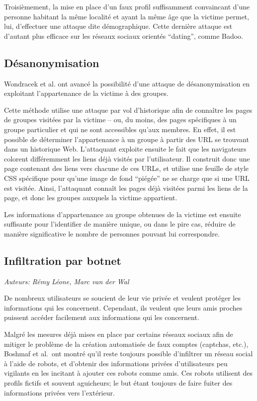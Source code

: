 Troisièmement, la mise en place d'un faux profil suffisamment convaincant d'une
personne habitant la même localité et ayant la même âge que la victime permet,
lui, d'effectuer une attaque dite démographique.  Cette dernière attaque est
d'autant plus efficace sur les réseaux sociaux orientés ``dating'', comme Badoo.


\subsection{Désanonymisation}

Wondracek et al. ont avancé la possibilité d'une attaque de désanonymisation en
exploitant l'appartenance de la victime à des groupes. \cite{whkk10}

Cette méthode utilise une attaque par vol d'historique afin de connaître les
pages de groupes visitées par la victime -- ou, du moins, des pages spécifiques à
un groupe particulier et qui ne sont accessibles qu'aux membres. En effet, il est
possible de déterminer l'appartenance à un groupe à partir des URL se trouvant dans un
historique Web.  L'attaquant exploite ensuite le fait que les navigateurs
colorent différemment les liens déjà visités par l'utilisateur. Il construit
donc une page contenant des liens vers chacune de ces URLs, et utilise une
feuille de style CSS spécifique pour qu'une image de fond ``piégée'' ne se
charge que si une URL est visitée.  Ainsi, l'attaquant connaît les pages déjà
visitées parmi les liens de la page, et donc les groupes auxquels la victime
appartient.

Les informations d'appartenance au groupe obtenues de la victime est ensuite
suffisante pour l'identifier de manière unique, ou dans le pire cas, réduire de
manière significative le nombre de personnes pouvant lui correspondre.

\subsection{Infiltration par botnet}

\begin{flushright}\textit{Auteurs: Rémy Léone, Marc van der Wal}\end{flushright}

De nombreux utilisateurs se soucient de leur vie privée et veulent protéger les
informations qui les concernent. Cependant, ils veulent que leurs amis proches
puissent accéder facilement aux informations qui les concernent. 

Malgré les mesures déjà mises en place par certains réseaux sociaux afin de
mitiger le problème de la création automatisée de faux comptes (captchas, etc.),
Boshmaf et al.\ ont montré qu'il reste toujours possible d'infiltrer
un réseau social à l'aide de robots, et d'obtenir des informations privées
d'utilisateurs peu vigilants en les incitant à ajouter ces robots comme amis.
\cite{Boshmaf:264} Ces robots utilisent des profils fictifs et souvent
aguicheurs; le but étant toujours de faire fuiter des informations
privées vers l'extérieur.

